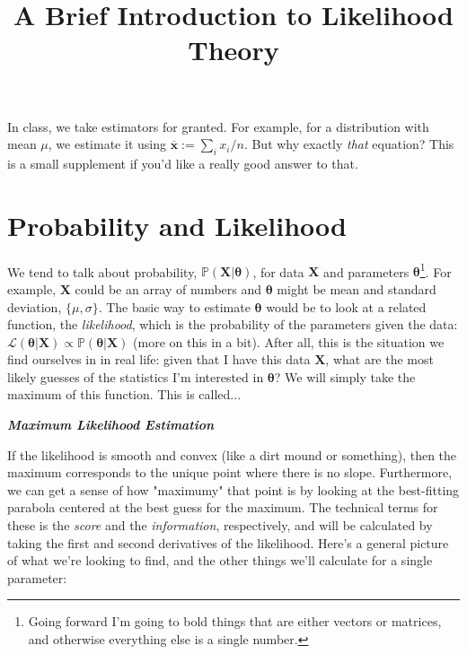 \documentclass{article}
\title{A Brief Introduction to Likelihood Theory}
\date{}
\begin{document}
\maketitle

In class, we take estimators for granted. For example, for a distribution with mean $\mu$, we estimate it using $\overline{\mathbf{x}}:=\sum_i x_i/n$. But why exactly \textit{that} equation? This is a small supplement if you'd like a really good answer to that.

\section{Probability and Likelihood}

We tend to talk about probability, $\mathbb{P}(\mathbf{X}|\boldsymbol{\theta})$, for data $\mathbf{X}$ and parameters $\boldsymbol{\theta}$\footnote{Going forward I'm going to bold things that are either vectors or matrices, and otherwise everything else is a single number.}. For example, $\mathbf{X}$ could be an array of numbers and $\boldsymbol{\theta}$ might be mean and standard deviation, $\{\mu, \sigma\}$. The basic way to estimate $\boldsymbol{\theta}$ would be to look at a related function, the \textit{likelihood}, which is the probability of the parameters given the data: $\mathcal{L}(\boldsymbol{\theta}|\mathbf{X}) \propto \mathbb{P}(\boldsymbol{\theta}|\mathbf{X})$ (more on this in a bit). After all, this is the situation we find ourselves in in real life: given that I have this data $\mathbf{X}$, what are the most likely guesses of the statistics I'm interested in $\boldsymbol{\theta}$? We will simply take the maximum of this function. This is called...
\begin{center}
\textbf{\textit{Maximum Likelihood Estimation}}
\end{center}

If the likelihood is smooth and convex (like a dirt mound or something), then the maximum corresponds to the unique point where there is no slope. Furthermore, we can get a sense of how "maximumy" that point is by looking at the best-fitting parabola centered at the best guess for the maximum. The technical terms for these is the \textit{score} and the \textit{information}, respectively, and will be calculated by taking the first and second derivatives of the likelihood. Here's a general picture of what we're looking to find, and the other things we'll calculate for a single parameter:
\end{document}
